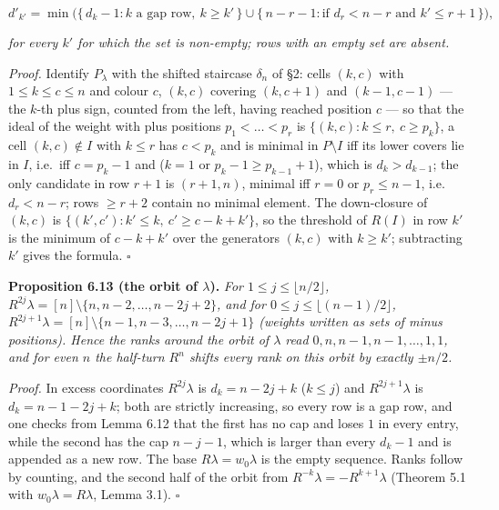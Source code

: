 \documentclass[
]{article}
\begin{document}
\[d'_{k'} = \min\Big(\{\,d_k - 1 : k \text{ a gap row},\ k \ge k'\,\} \cup \{\,n - r - 1 : \text{if } d_r < n - r \text{ and } k' \le r + 1\,\}\Big),\]

\emph{for every \(k'\) for which the set is non-empty; rows with an
empty set are absent.}

\emph{Proof.} Identify \(P_\lambda\) with the shifted staircase
\(\delta_n\) of §2: cells \((k, c)\) with \(1 \le k \le c \le n\) and
colour \(c\), \((k, c)\) covering \((k, c+1)\) and \((k-1, c-1)\) ---
the \(k\)-th plus sign, counted from the left, having reached position
\(c\) --- so that the ideal of the weight with plus positions
\(p_1 < \dots < p_r\) is \(\{(k, c) : k \le r,\ c \ge p_k\}\), a cell
\((k, c) \notin I\) with \(k \le r\) has \(c < p_k\) and is minimal in
\(P \setminus I\) iff its lower covers lie in \(I\), i.e.~iff
\(c = p_k - 1\) and (\(k = 1\) or \(p_k - 1 \ge p_{k-1} + 1\)), which is
\(d_k > d_{k-1}\); the only candidate in row \(r+1\) is \((r+1, n)\),
minimal iff \(r = 0\) or \(p_r \le n - 1\), i.e.~\(d_r < n - r\); rows
\(\ge r + 2\) contain no minimal element. The down-closure of \((k, c)\)
is \(\{(k', c') : k' \le k,\ c' \ge c - k + k'\}\), so the threshold of
\(R(I)\) in row \(k'\) is the minimum of \(c - k + k'\) over the
generators \((k, c)\) with \(k \ge k'\); subtracting \(k'\) gives the
formula. \(\square\)

\textbf{Proposition 6.13 (the orbit of \(\lambda\)).} \emph{For
\(1 \le j \le \lfloor n/2 \rfloor\),
\(R^{2j}\lambda = [n] \setminus \{n, n-2, \dots, n-2j+2\}\), and for
\(0 \le j \le \lfloor (n-1)/2 \rfloor\),
\(R^{2j+1}\lambda = [n] \setminus \{n-1, n-3, \dots, n-2j+1\}\) (weights
written as sets of minus positions). Hence the ranks around the orbit of
\(\lambda\) read \(0, n, n-1, n-1, \dots, 1, 1\), and for even \(n\) the
half-turn \(R^n\) shifts every rank on this orbit by exactly
\(\pm n/2\).}

\emph{Proof.} In excess coordinates \(R^{2j}\lambda\) is
\(d_k = n - 2j + k\) (\(k \le j\)) and \(R^{2j+1}\lambda\) is
\(d_k = n - 1 - 2j + k\); both are strictly increasing, so every row is
a gap row, and one checks from Lemma 6.12 that the first has no cap and
loses \(1\) in every entry, while the second has the cap \(n - j - 1\),
which is larger than every \(d_k - 1\) and is appended as a new row. The
base \(R\lambda = w_0\lambda\) is the empty sequence. Ranks follow by
counting, and the second half of the orbit from
\(R^{-k}\lambda = -R^{k+1}\lambda\) (Theorem 5.1 with
\(w_0\lambda = R\lambda\), Lemma 3.1). \(\square\)
\end{document}
